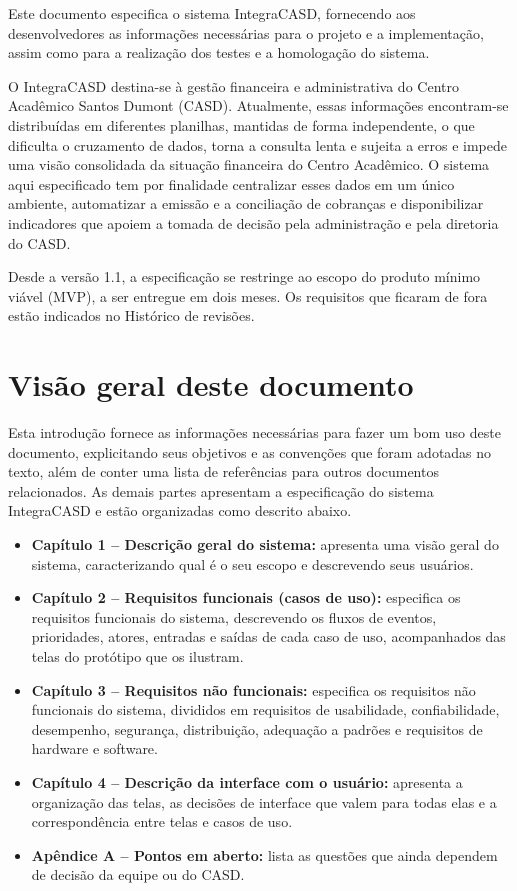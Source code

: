\documentclass[11pt,a4paper,oneside]{report}
\begin{document}
Este documento especifica o sistema IntegraCASD, fornecendo aos desenvolvedores as informações
necessárias para o projeto e a implementação, assim como para a realização dos testes e a
homologação do sistema.

O IntegraCASD destina-se à gestão financeira e administrativa do Centro Acadêmico Santos Dumont
(CASD). Atualmente, essas informações encontram-se distribuídas em diferentes planilhas, mantidas
de forma independente, o que dificulta o cruzamento de dados, torna a consulta lenta e sujeita a
erros e impede uma visão consolidada da situação financeira do Centro Acadêmico. O sistema aqui
especificado tem por finalidade centralizar esses dados em um único ambiente, automatizar a emissão
e a conciliação de cobranças e disponibilizar indicadores que apoiem a tomada de decisão pela
administração e pela diretoria do CASD.

Desde a versão 1.1, a especificação se restringe ao escopo do produto mínimo viável (MVP), a ser
entregue em dois meses. Os requisitos que ficaram de fora estão indicados no Histórico de revisões.

\section*{Visão geral deste documento}

Esta introdução fornece as informações necessárias para fazer um bom uso deste documento,
explicitando seus objetivos e as convenções que foram adotadas no texto, além de conter uma lista
de referências para outros documentos relacionados. As demais partes apresentam a especificação do
sistema IntegraCASD e estão organizadas como descrito abaixo.
\begin{itemize}
  \item \textbf{Capítulo 1 -- Descrição geral do sistema:} apresenta uma visão geral do sistema,
        caracterizando qual é o seu escopo e descrevendo seus usuários.
  \item \textbf{Capítulo 2 -- Requisitos funcionais (casos de uso):} especifica os requisitos
        funcionais do sistema, descrevendo os fluxos de eventos, prioridades, atores, entradas e
        saídas de cada caso de uso, acompanhados das telas do protótipo que os ilustram.
  \item \textbf{Capítulo 3 -- Requisitos não funcionais:} especifica os requisitos não funcionais
        do sistema, divididos em requisitos de usabilidade, confiabilidade, desempenho, segurança,
        distribuição, adequação a padrões e requisitos de hardware e software.
  \item \textbf{Capítulo 4 -- Descrição da interface com o usuário:} apresenta a organização das
        telas, as decisões de interface que valem para todas elas e a correspondência entre telas e
        casos de uso.
  \item \textbf{Apêndice A -- Pontos em aberto:} lista as questões que ainda dependem de decisão
        da equipe ou do CASD.
\end{itemize}
\end{document}
